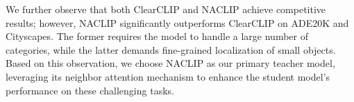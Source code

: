 We further observe that both ClearCLIP and NACLIP achieve competitive results; however, NACLIP significantly outperforms ClearCLIP on ADE20K and Cityscapes. The former requires the model to handle a large number of categories, while the latter demands fine-grained localization of small objects. Based on this observation, we choose NACLIP as our primary teacher model, leveraging its neighbor attention mechanism to enhance the student model's performance on these challenging tasks.